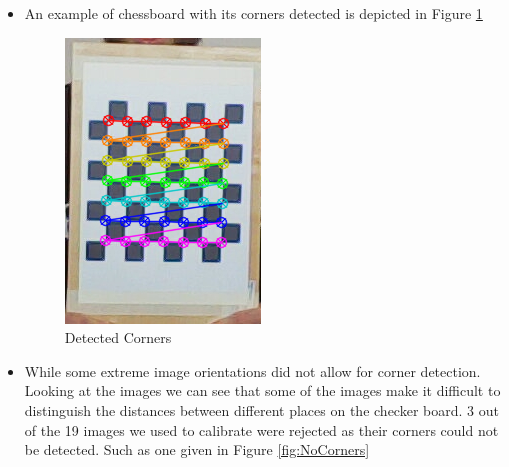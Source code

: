 \begin{itemize}
                            
        \item An example of chessboard with its corners detected is depicted in Figure \ref{fig:ChessBoardCorners}
            
            \begin{figure}[H] 
                            \centering
                            \includegraphics[scale=1.5]{"images/experiment_4/corner_detected.png"}
                            \caption{Detected Corners}
                            \label{fig:ChessBoardCorners}
                     \end{figure}
                     
                     
        \item  While some extreme image orientations did not allow for corner detection. Looking at the images we can see that some of the images make it difficult to distinguish the distances between different places on the checker board. 3 out of the 19 images we used to calibrate were rejected as their corners could not be detected.
                Such as one given in Figure \ref{fig:NoCorners}
    

\end{itemize}
